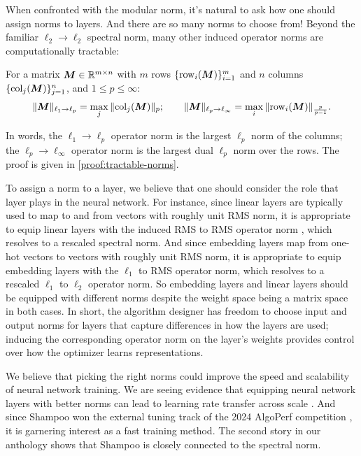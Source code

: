 When confronted with the modular norm, it's natural to ask how one should assign norms to layers. And there are so many norms to choose from! Beyond the familiar $\ell_2 \to \ell_2$ spectral norm, many other induced operator norms are computationally tractable:
\begin{myproposition}\label{prop:tractable-norms} For a matrix ${\bm{M}}\in\mathbb{R}^{m\times n}$ with $m$ rows $\{\mathrm{row}_i({\bm{M}})\}_{i=1}^m$ and $n$ columns $\{\mathrm{col}_j({\bm{M}})\}_{j=1}^n$, and $1\leq p \leq \infty$:
    \begin{align}
        \Vert {{\bm{M}}} \Vert_{\ell_1\to \ell_p} = \max_j \Vert {\mathrm{col}_j({\bm{M}})} \Vert_p; \qquad
        \Vert {{\bm{M}}} \Vert_{\ell_p\to \ell_\infty}= \max_i \Vert {\mathrm{row}_i({\bm{M}})} \Vert_{\frac{p}{p-1}}.
\end{align}
\end{myproposition}
In words, the $\ell_1\to\ell_p$ operator norm is the largest $\ell_p$ norm of the columns; the $\ell_p\to\ell_\infty$ operator norm is the largest dual $\ell_p$ norm over the rows. The proof is given in \cref{proof:tractable-norms}.









To assign a norm to a layer, we believe that one should consider the role that layer plays in the neural network. For instance, since linear layers are typically used to map to and from vectors with roughly unit RMS norm, it is appropriate to equip linear layers with the induced RMS to RMS operator norm \citep{my-spectral}, which resolves to a rescaled spectral norm. And since embedding layers map from one-hot vectors to vectors with roughly unit RMS norm, it is appropriate to equip embedding layers with the $\ell_1$ to RMS operator norm, which resolves to a rescaled $\ell_1$ to $\ell_2$ operator norm. So embedding layers and linear layers should be equipped with different norms despite the weight space being a matrix space in both cases. In short, the algorithm designer has freedom to choose input and output norms for layers that capture differences in how the layers are used; inducing the corresponding operator norm on the layer's weights provides control over how the optimizer learns representations.


We believe that picking the right norms could improve the speed and scalability of neural network training. We are seeing evidence that equipping neural network layers with better norms can lead to learning rate transfer across scale \citep{my-spectral,modula}. And since Shampoo won the external tuning track of the 2024 AlgoPerf competition \citep{Dahl2023AlgoPerf}, it is garnering interest as a fast training method. The second story in our anthology shows that Shampoo is closely connected to the spectral norm.

